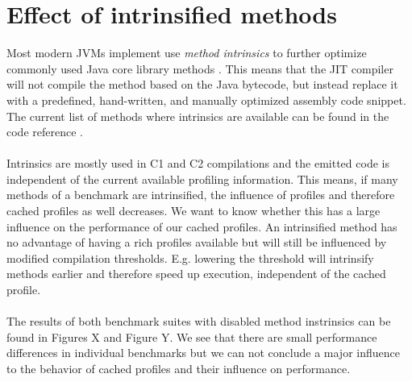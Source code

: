 \section{Effect of intrinsified methods}
\label{s:perf_intrinsics}
Most modern JVMs implement use \textit{method intrinsics} to further optimize commonly used Java core library methods \cite{intrinsics_talk}.
This means that the JIT compiler will not compile the method based on the Java bytecode, but instead replace it with a predefined, hand-written, and manually optimized assembly code snippet. The current list of methods where intrinsics are available can be found in the code reference \cite{code_intrinsics}.
\\\\
Intrinsics are mostly used in C1 and C2 compilations and the emitted code is independent of the current available profiling information.
This means, if many methods of a benchmark are intrinsified, the influence of profiles and therefore cached profiles as well decreases.
We want to know whether this has a large influence on the performance of our cached profiles. An intrinsified method has no advantage of having a rich profiles available but will still be influenced by modified compilation thresholds. E.g. lowering the threshold will intrinsify methods earlier and therefore speed up execution, independent of the cached profile.
\\\\
The results of both benchmark suites with disabled method instrinsics can be found in Figures X and Figure Y.
We see that there are small performance differences in individual benchmarks but we can not conclude a major influence to the behavior of cached profiles and their influence on performance.
%
%
%
%

